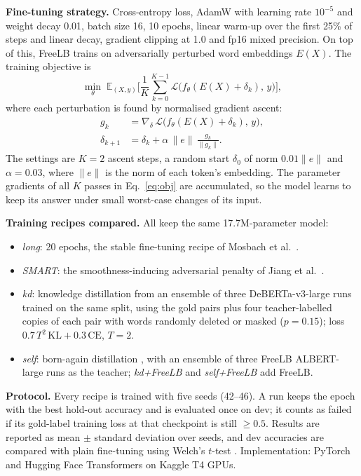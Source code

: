 \documentclass[11pt]{article}
\begin{document}
\textbf{Fine-tuning strategy.} Cross-entropy loss, AdamW \cite{loshchilov2019adamw} with learning rate $10^{-5}$
and weight decay 0.01, batch size 16, 10 epochs, linear warm-up over the first 25\% of steps and linear decay,
gradient clipping at 1.0 and fp16 mixed precision. On top of this, FreeLB \cite{zhu2020freelb} trains
on adversarially perturbed word embeddings $E(X)$. The training objective is
\begin{equation}
\min_\theta\; \mathbb{E}_{(X,y)}\Big[\frac{1}{K}\sum_{k=0}^{K-1}\mathcal{L}\big(f_\theta(E(X)+\delta_k),\,y\big)\Big],
\label{eq:obj}
\end{equation}
where each perturbation is found by normalised gradient ascent:
\begin{align}
g_k &= \nabla_{\delta}\,\mathcal{L}\big(f_\theta(E(X)+\delta_k),\,y\big), \label{eq:grad}\\
\delta_{k+1} &= \delta_k + \alpha\,\lVert e\rVert\,\frac{g_k}{\lVert g_k\rVert}. \label{eq:step}
\end{align}
The settings are $K=2$ ascent steps, a random start $\delta_0$ of norm $0.01\lVert e\rVert$ and $\alpha=0.03$, where
$\lVert e\rVert$ is the norm of each token's embedding. The parameter gradients of all $K$ passes in
Eq.~\eqref{eq:obj} are accumulated, so the model learns to keep its answer under small worst-case changes of its input.

\textbf{Training recipes compared.} All keep the same 17.7M-parameter model:
\begin{itemize}
  \item \emph{long}: 20 epochs, the stable fine-tuning recipe of Mosbach et al.~\cite{mosbach2021stability}.
  \item \emph{SMART}: the smoothness-inducing adversarial penalty of Jiang et al.~\cite{jiang2020smart}.
  \item \emph{kd}: knowledge distillation \cite{hinton2015distilling} from an ensemble of three DeBERTa-v3-large
        runs \cite{he2023debertav3} trained on the same split, using the gold pairs plus four teacher-labelled copies of
        each pair with words randomly deleted or masked ($p=0.15$); loss $0.7\,T^2\,\mathrm{KL}+0.3\,\mathrm{CE}$, $T=2$.
  \item \emph{self}: born-again distillation \cite{furlanello2018born}, with an ensemble of three FreeLB
        ALBERT-large runs as the teacher; \emph{kd+FreeLB} and \emph{self+FreeLB} add FreeLB.
\end{itemize}

\textbf{Protocol.} Every recipe is trained with five seeds (42--46). A run keeps the epoch with the best hold-out
accuracy and is evaluated once on dev; it counts as failed if its gold-label training loss at that checkpoint is
still $\ge 0.5$. Results are reported as mean $\pm$ standard deviation over seeds, and dev accuracies are compared with plain fine-tuning
using Welch's $t$-test \cite{welch1947}. Implementation: PyTorch \cite{paszke2019pytorch} and Hugging Face
Transformers \cite{wolf2020transformers} on Kaggle T4 GPUs.
\end{document}
